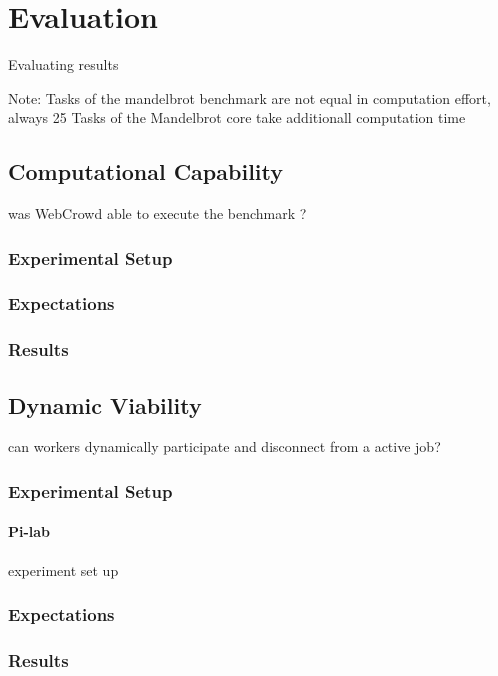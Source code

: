 \chapter{Evaluation}
\label{ch:evaluation}
Evaluating results

Note: Tasks of the mandelbrot benchmark are not equal in computation effort, always 25 Tasks of the Mandelbrot core take additionall computation time

\section{Computational Capability}
\label{sec:evaluation:benchmark}
was WebCrowd able to execute the benchmark ?

\subsection{Experimental Setup}

\subsection{Expectations}

\subsection{Results}

\section{Dynamic Viability}
\label{sec:evaluation:workers}
can workers dynamically participate and disconnect from a active job?

\subsection{Experimental Setup}

\subsubsection{Pi-lab}
experiment set up

\subsection{Expectations}

\subsection{Results}

